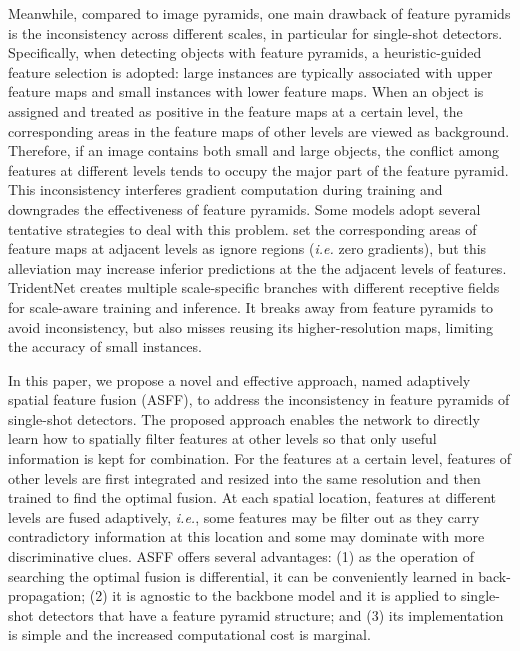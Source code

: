 \documentclass[10pt,twocolumn,letterpaper]{article}
\begin{document}
Meanwhile, compared to image pyramids, one main drawback of feature pyramids is the inconsistency across different scales, in particular for single-shot detectors. Specifically, when detecting objects with feature pyramids, a heuristic-guided feature selection is adopted: large instances are typically associated with upper feature maps and small instances with lower feature maps. When an object is assigned and treated as positive in the feature maps at a certain level, the corresponding areas in the feature maps of other levels are viewed as background. Therefore, if an image contains both small and large objects, the conflict among features at different levels tends to occupy the major part of the feature pyramid. This inconsistency interferes gradient computation during training and downgrades the effectiveness of feature pyramids. Some models adopt several tentative strategies to deal with this problem. \cite{guide,FSAF} set the corresponding areas of feature maps at adjacent levels as ignore regions (\emph{i.e.} zero gradients), but this alleviation may increase inferior predictions at the the adjacent levels of features. TridentNet \cite{trident} creates multiple scale-specific branches with different receptive fields for scale-aware training and inference. It breaks away from feature pyramids to avoid inconsistency, but also misses reusing its higher-resolution maps, limiting the accuracy of small instances.

In this paper, we propose a novel and effective approach, named adaptively spatial feature fusion (ASFF), to address the inconsistency in feature pyramids of single-shot detectors. The proposed approach enables the network to directly learn how to spatially filter features at other levels so that only useful information is kept for combination. For the features at a certain level, features of other levels are first integrated and resized into the same resolution and then trained to find the optimal fusion. At each spatial location, features at different levels are fused adaptively, \emph{i.e.}, some features may be filter out as they carry contradictory information at this location and some may dominate with more discriminative clues. ASFF offers several advantages: (1) as the operation of searching the optimal fusion is differential, it can be conveniently learned in back-propagation; (2) it is agnostic to the backbone model and it is applied to single-shot detectors that have a feature pyramid structure; and (3) its implementation is simple and the increased computational cost is marginal.
\end{document}
